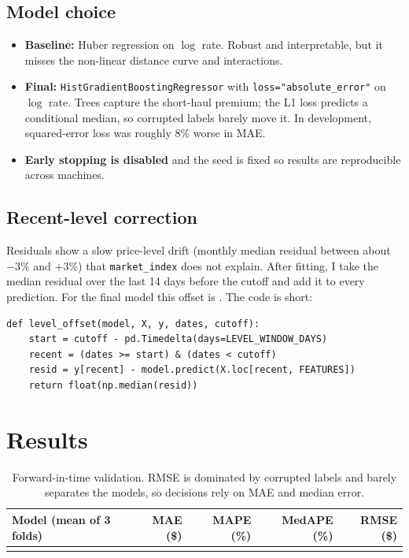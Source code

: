 \documentclass[10pt,a4paper]{article}
\begin{document}
\subsection{Model choice}
\begin{itemize}
  \item \textbf{Baseline:} Huber regression on $\log$ rate. Robust and interpretable, but it misses the non-linear distance curve and interactions.
  \item \textbf{Final:} \texttt{HistGradientBoostingRegressor} with \texttt{loss="absolute\_error"} on $\log$ rate. Trees capture the short-haul premium; the L1 loss
        predicts a conditional median, so corrupted labels barely move it. In development, squared-error loss was roughly 8\% worse in MAE.
  \item \textbf{Early stopping is disabled} and the seed is fixed so results are reproducible across machines.
\end{itemize}

\subsection{Recent-level correction}
Residuals show a slow price-level drift (monthly median residual between about $-3\%$ and $+3\%$) that \texttt{market\_index} does not explain.
After fitting, I take the median residual over the last 14 days before the cutoff and add it to every prediction.
For the final model this offset is \xOffset. The code is short:

\begin{codebox}
\begin{lstlisting}[style=py]
def level_offset(model, X, y, dates, cutoff):
    start = cutoff - pd.Timedelta(days=LEVEL_WINDOW_DAYS)
    recent = (dates >= start) & (dates < cutoff)
    resid = y[recent] - model.predict(X.loc[recent, FEATURES])
    return float(np.median(resid))
\end{lstlisting}
\end{codebox}

\section{Results}
\begin{table}[H]
\centering\small
\begin{tabular}{@{}lrrrr@{}}
\toprule
\textbf{Model (mean of 3 folds)} & \textbf{MAE (\$)} & \textbf{MAPE (\%)} & \textbf{MedAPE (\%)} & \textbf{RMSE (\$)} \\
\midrule
\\
\bottomrule
\end{tabular}
\caption{Forward-in-time validation. RMSE is dominated by corrupted labels and barely separates the models, so decisions rely on MAE and median error.}
\end{table}
\end{document}
